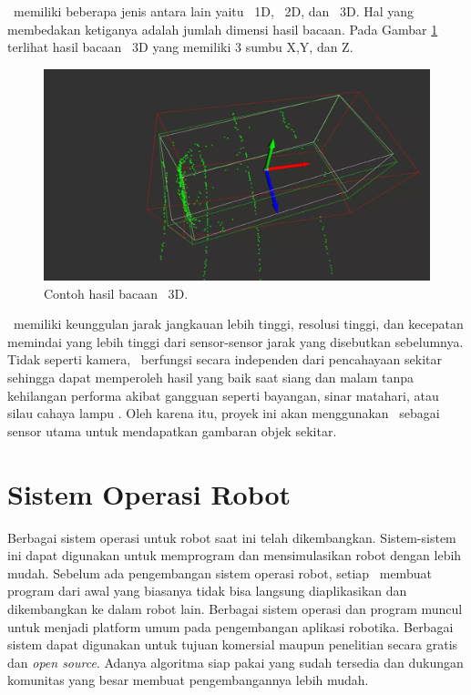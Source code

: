          \lidar\ memiliki beberapa jenis antara lain yaitu \lidar\ 1D, \lidar\ 2D, dan \lidar\ 3D. Hal yang membedakan ketiganya adalah jumlah dimensi hasil bacaan. Pada Gambar \ref{fig:Ch02_3d_bacaan} terlihat hasil bacaan \lidar\ 3D yang memiliki 3 sumbu X,Y, dan Z.
         \begin{figure}[H]
            \centering
            \includegraphics[scale=0.3]{3D_lidar_scanan.png}
            \caption{Contoh hasil bacaan \lidar\ 3D\cite{b_g2}.}
            \label{fig:Ch02_3d_bacaan}
        \end{figure}
    
         \lidar\ memiliki keunggulan jarak jangkauan lebih tinggi, resolusi tinggi, dan kecepatan memindai yang lebih tinggi dari sensor-sensor jarak yang disebutkan sebelumnya. Tidak seperti kamera, \lidar\ berfungsi secara independen dari pencahayaan sekitar sehingga dapat memperoleh hasil yang baik saat siang dan malam tanpa kehilangan performa akibat gangguan seperti bayangan, sinar matahari, atau silau cahaya lampu \cite{b6}. Oleh karena itu, proyek ini akan menggunakan \lidar\ sebagai sensor utama untuk mendapatkan gambaran objek sekitar.

\section{Sistem Operasi Robot}
\label{sec:ROS} 

    Berbagai sistem operasi untuk robot saat ini telah dikembangkan. Sistem-sistem ini dapat digunakan untuk memprogram dan mensimulasikan robot dengan lebih mudah.
    Sebelum ada pengembangan sistem operasi robot, setiap \dev\ membuat program dari awal yang biasanya tidak bisa langsung diaplikasikan dan dikembangkan ke dalam robot lain.
    Berbagai sistem operasi dan program muncul untuk menjadi platform umum pada pengembangan aplikasi robotika. Berbagai sistem dapat digunakan untuk tujuan komersial maupun penelitian secara gratis dan \textit{open source}. Adanya algoritma siap pakai yang sudah tersedia dan dukungan komunitas yang besar membuat pengembangannya lebih mudah.
    
